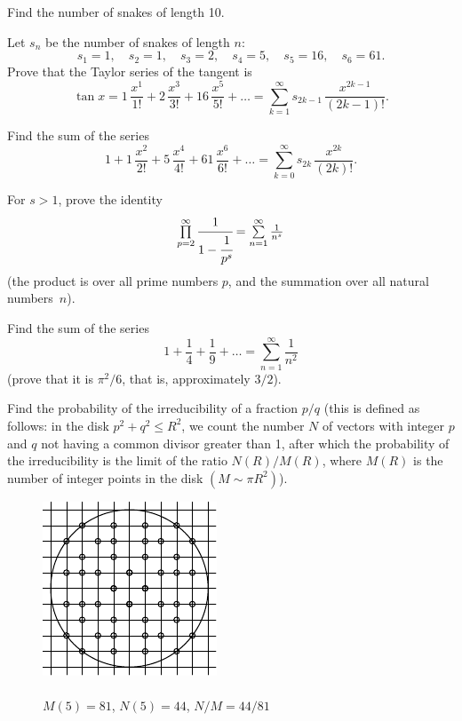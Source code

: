 \documentclass[12pt]{article}  %
\begin{document}
\medskip
\noindent 
Find the number of snakes of length 10.

\bigskip
{} Let $s_n$ be the number of snakes of length $n$:
$$
s_1=1, \quad s_2=1, \quad s_3=2, \quad s_4=5, \quad s_5=16, \quad s_6=61.
$$
Prove that the Taylor series of the tangent is
$$
\tan x=1\, \frac{x^1}{1!}+2\, \frac{x^3}{3!}+16\, \frac{x^5}{5!}+\dots=
\textstyle\sum\limits_{k=1}^{\infty} s_{2k-1}\, \frac{x^{2k-1}}{(2k-1)!}.
$$
 

\bigskip
{} Find the sum of the series
$$
1+1\, \frac{x^2}{2!}+5\, \frac{x^4}{4!}+61\, \frac{x^6}{6!}+\dots=
\textstyle\sum\limits_{k=0}^{\infty} s_{2k}\,\frac{x^{2k}}{(2k)!}.
$$

\bigskip
{} For $s>1$, prove the identity
$$
\textstyle\prod\limits_{p=2}^{\infty} \cfrac{1}{1-\cfrac{1}{p^s}}=\sum\limits_{n=1}^{\infty} \frac{1}{n^s}
$$ 
(the product is over all prime numbers $p$, and the summation over all natural numbers~$n$).

\newpage
{} Find the sum of the series
$$
1+ \frac{1}{4}+ \frac{1}{9}+\dots=\textstyle\sum\limits_{n=1}^{\infty} \frac{1}{n^2}
$$
(prove that it is $\pi^2/6$, that is, approximately $3/2$). 

\bigskip
{} Find the probability of the irreducibility of a fraction $p/q$ (this is defined as follows:
in the disk $p^2+q^2 \leqslant R^2$, we count the number $N$ of vectors with integer
$p$ and $q$ not having a common divisor greater than 1, after which the probability of the irreducibility is the
limit of the ratio $N(R)/M(R)$, where $M(R)$ is the number of integer points in the disk $(M \sim \pi R^2)$).
\begin{figure}[h]
\footnotesize
\centering
 \includegraphics{taskbook-36}\\{\ } \\
$M(5)=81$, $N(5)=44$, $N/M = 44/81$
\end{figure}
\end{document}
